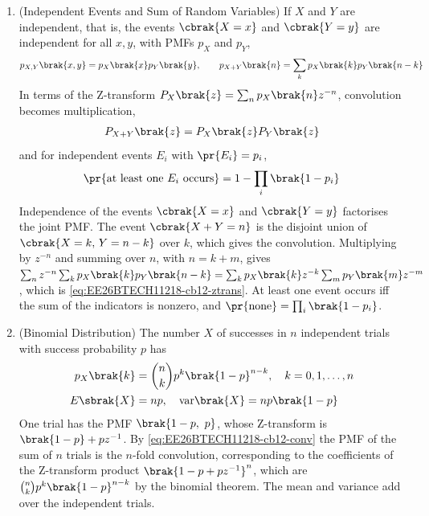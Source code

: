 \begin{enumerate}[label=\thesubsection.\arabic*, ref=\thesubsection.\theenumi,itemsep=1.5em]

\item (Independent Events and Sum of Random Variables) If $X$ and $Y$ are independent, that is, the events $\cbrak{X=x}$ and $\cbrak{Y=y}$ are independent for all $x,y$, with PMFs $p_X$ and $p_Y$,
\begin{align}
p_{X,Y}\brak{x,y} = p_X\brak{x}p_Y\brak{y}, \qquad p_{X+Y}\brak{n} = \sum_{k}p_X\brak{k}p_Y\brak{n-k}
\label{eq:EE26BTECH11218-cb12-conv}
\end{align}
In terms of the Z-transform $P_X\brak{z}=\sum_np_X\brak{n}z^{-n}$, convolution becomes multiplication,
\begin{align}
P_{X+Y}\brak{z} = P_X\brak{z}P_Y\brak{z}
\label{eq:EE26BTECH11218-cb12-ztrans}
\end{align}
and for independent events $E_i$ with $\pr{E_i}=p_i$,
\begin{align}
\pr{\text{at least one } E_i \text{ occurs}} = 1-\prod_i\brak{1-p_i}
\label{eq:EE26BTECH11218-cb12-atleast}
\end{align}
\solution Independence of the events $\cbrak{X=x}$ and $\cbrak{Y=y}$ factorises the joint PMF. The event $\cbrak{X+Y=n}$ is the disjoint union of $\cbrak{X=k,\,Y=n-k}$ over $k$, which gives the convolution. Multiplying by $z^{-n}$ and summing over $n$, with $n=k+m$, gives $\sum_n z^{-n}\sum_kp_X\brak{k}p_Y\brak{n-k}=\sum_kp_X\brak{k}z^{-k}\sum_mp_Y\brak{m}z^{-m}$, which is \eqref{eq:EE26BTECH11218-cb12-ztrans}. At least one event occurs iff the sum of the indicators is nonzero, and $\pr{\text{none}}=\prod_i\brak{1-p_i}$.

\item (Binomial Distribution) The number $X$ of successes in $n$ independent trials with success probability $p$ has
\begin{align}
p_X\brak{k} &= \binom{n}{k}p^k\brak{1-p}^{n-k}, \quad k=0,1,\dots,n \nonumber \\
E\sbrak{X} &= np, \quad \mathrm{var}\brak{X}=np\brak{1-p}
\label{eq:EE26BTECH11218-cb12-binom}
\end{align}
\solution One trial has the PMF $\brak{1-p,\ p}$, whose Z-transform is $\brak{1-p}+pz^{-1}$. By \eqref{eq:EE26BTECH11218-cb12-conv} the PMF of the sum of $n$ trials is the $n$-fold convolution, corresponding to the coefficients of the Z-transform product $\brak{1-p+pz^{-1}}^n$, which are $\binom{n}{k}p^k\brak{1-p}^{n-k}$ by the binomial theorem. The mean and variance add over the independent trials.


\end{enumerate}
